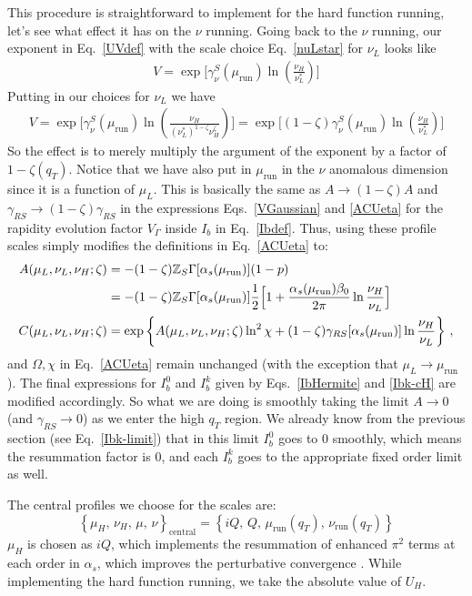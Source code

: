 \documentclass[a4,letterpaper,11pt]{article}
\newcommand{\nn}{\nonumber}
\newcommand{\be}{\begin{equation}}
\newcommand{\ee}{\end{equation}}
\newcommand{\bea}{\begin{eqnarray}}
\newcommand{\eea}{\end{eqnarray}}
\newcommand{\run}{\text{run}}
\newcommand{\mur}{\mu_\run}
\newcommand{\nur}{\nu_\run}
\newcommand{\as}{\alpha_s}
\newcommand{\zed}{\mathbb{Z}}
\newcommand{\eq}[1]{Eq.~\eqref{#1}}
\newcommand{\eqs}[2]{Eqs.~\eqref{#1} and \eqref{#2}}
\begin{document}
This procedure is straightforward to implement for the hard function running, let's see what effect it has on the $\nu$ running. Going back to the $\nu$ running, our exponent in \eq{UVdef} with the scale choice \eq{nuLstar} for $\nu_L$ looks like 
\bea
V =  \exp\biggl[ \gamma_\nu^S(\mur) \ln\left( \frac{\nu_H}{\nu_L^*} \right) \biggr]  
\eea
Putting in our choices for $\nu_L$ we have 
\bea
 V =  \exp\biggl[ \gamma_{\nu}^S(\mur) \ln\left( \frac{\nu_H}{(\nu_L^*)^{1-\zeta} \nu_H^\zeta} \right) \biggr] = \exp\biggl[(1-\zeta) \gamma_\nu^S(\mur) \ln\left( \frac{\nu_H}{\nu_L^*} \right) \biggr]
\eea
So the effect is to merely multiply the argument of the exponent by a factor of $1-\zeta(q_T)$. Notice that we have also put in $\mur$ in the $\nu$ anomalous dimension since it is a function of $\mu_L$. 
 This is basically the same as $A \rightarrow (1-\zeta)A$ and $\gamma_{RS}\to (1-\zeta)\gamma_{RS}$ in the expressions \eqs{VGaussian}{ACUeta} for the rapidity evolution factor $V_\Gamma$ inside $I_b$ in \eq{Ibdef}. Thus, using these profile scales simply modifies the definitions in \eq{ACUeta} to:
\begin{align} \label{ACprofile}
A(\mu_L,\nu_L,\nu_H;\zeta) &= -(1-\zeta)\zed_S\Gamma[\as(\mur)] (1-p) \\
&= -(1-\zeta)\zed_S \Gamma[\as(\mur)] \frac{1}{2} \Bigl[ 1 + \frac{\as(\mur)\beta_0}{2\pi} \ln\frac{\nu_H}{\nu_L}\Bigr] \nn \\
C(\mu_L,\nu_L,\nu_H;\zeta) &= \exp\left\{ A(\mu_L,\nu_L,\nu_H;\zeta) \ln^2\chi + (1-\zeta)\gamma_{RS} [\as(\mur)] \ln \frac{\nu_H}{\nu_L}\right\}  \,, \nn
\end{align}
and $\Omega,\chi$ in \eq{ACUeta} remain unchanged (with the exception that $\mu_L\to \mur$). The final expressions for $I_b^0$ and $I_b^k$ given by \eqs{IbHermite}{Ibk-cH} are modified accordingly.   So what we are doing is smoothly taking the limit $A \rightarrow 0$ (and $\gamma_{RS}\to0$)  as we enter the high $q_T$ region. We already know from the previous section (see \eq{Ibk-limit}) that in this limit $I_b^0$ goes to 0 smoothly, which means the resummation factor is 0, and each $I_b^k$ goes to the appropriate fixed order limit as well.

The central profiles we choose for the scales are:
\be\label{central}
\left\{\mu_H,\, \nu_H,\,\mu,\, \nu\right\}_\text{central}=\left\{iQ,\, Q,\, \mur(q_T),\, \nur(q_T) \right\}
\ee
$\mu_H$ is chosen as $i Q$, which implements the resummation of enhanced $\pi^2$ terms at each order in $\alpha_s$, which improves the perturbative convergence \cite{Ahrens:2008qu,Ahrens:2008nc}. While implementing the hard function running, we take the absolute value of $U_H$. 
\end{document}
